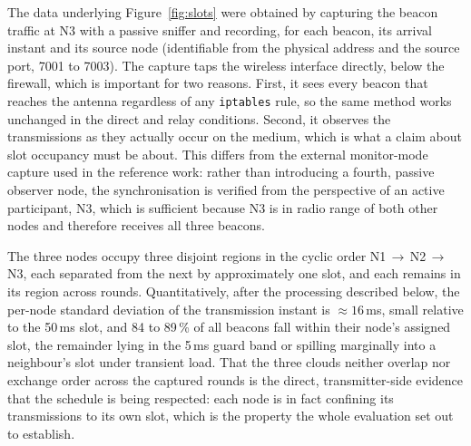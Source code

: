 The data underlying Figure~\ref{fig:slots} were obtained by capturing the
beacon traffic at N3 with a passive sniffer and recording, for each beacon, its
arrival instant and its source node (identifiable from the physical address and
the source port, 7001 to 7003). The capture taps the wireless interface directly,
below the firewall, which is important for two reasons. First, it sees every
beacon that reaches the antenna regardless of any \texttt{iptables} rule, so the
same method works unchanged in the direct and relay conditions. Second, it
observes the transmissions as they actually occur on the medium, which is what a
claim about slot occupancy must be about. This differs from the external
monitor-mode capture used in the reference work: rather than introducing a
fourth, passive observer node, the synchronisation is verified from the
perspective of an active participant, N3, which is sufficient because N3 is in
radio range of both other nodes and therefore receives all three beacons.

The three nodes occupy three disjoint regions in the cyclic order
N1\,$\to$\,N2\,$\to$\,N3, each separated from the next by approximately one
slot, and each remains in its region across rounds. Quantitatively, after the
processing described below, the per-node standard deviation of the transmission
instant is $\approx 16$\,ms, small relative to the 50\,ms slot, and
84 to 89\,\% of all beacons fall within their node's assigned slot, the remainder
lying in the 5\,ms guard band or spilling marginally into a neighbour's slot
under transient load. That the three clouds neither overlap nor exchange order
across the captured rounds is the direct, transmitter-side evidence that the
schedule is being respected: each node is in fact confining its transmissions
to its own slot, which is the property the whole evaluation set out to
establish.

